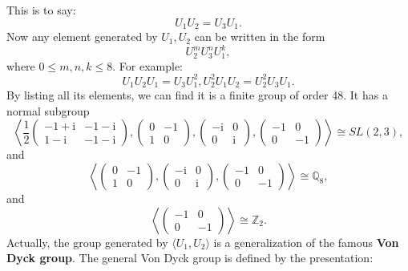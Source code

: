 \documentclass{book}
\begin{document}
This is to say:
\begin{equation*}
U_{1} U_{2} =U_{3} U_{1} .
\end{equation*}
Now any element generated by $U_{1} ,U_{2}$ can be written in the form
\begin{equation*}
U_{2}^{m} U_{3}^{n} U_{1}^{k} ,
\end{equation*}
where $0\leq m,n,k\leq 8$. For example:
\begin{equation*}
U_{1} U_{2} U_{1} =U_{3} U_{1}^{2} ,U_{2}^{2} U_{1} U_{2} =U_{2}^{2} U_{3} U_{1} .
\end{equation*}
By listing all its elements, we can find it is a finite group of order 48. It has a normal subgroup\cite{GAP4}
\begin{equation*}
\left< \frac{1}{2}\begin{pmatrix}
-1+\mathrm{i} & -1-\mathrm{i}\\
1-\mathrm{i} & -1-\mathrm{i}
\end{pmatrix} ,\begin{pmatrix}
0 & -1\\
1 & 0
\end{pmatrix} ,\begin{pmatrix}
-\mathrm{i} & 0\\
0 & \mathrm{i}
\end{pmatrix} ,\begin{pmatrix}
-1 & 0\\
0 & -1
\end{pmatrix}\right> \cong SL( 2,3) ,
\end{equation*}
and
\begin{equation*}
\left< \begin{pmatrix}
0 & -1\\
1 & 0
\end{pmatrix} ,\begin{pmatrix}
-\mathrm{i} & 0\\
0 & \mathrm{i}
\end{pmatrix} ,\begin{pmatrix}
-1 & 0\\
0 & -1
\end{pmatrix}\right> \cong \mathbb{Q}_{8} ,
\end{equation*}
and
\begin{equation*}
\left< \begin{pmatrix}
-1 & 0\\
0 & -1
\end{pmatrix}\right> \cong \mathbb{Z}_{2} .
\end{equation*}
Actually, the group generated by $\langle U_{1} ,U_{2} \rangle $ is a generalization of the famous \textbf{Von Dyck group}\cite{stoytchev2020class}. The general Von Dyck group is defined by the presentation:
\end{document}
